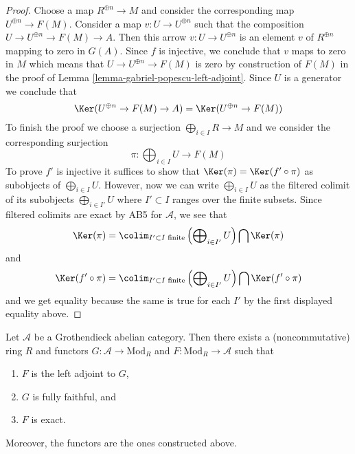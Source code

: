 \begin{proof}
Choose a map $R^{\oplus n} \to M$ and consider the corresponding map
$U^{\oplus n} \to F(M)$. Consider a map $v : U \to U^{\oplus n}$
such that the composition $U \to U^{\oplus n} \to F(M) \to A$.
Then this arrow $v : U \to U^{\oplus n}$ is an element
$v$ of $R^{\oplus n}$ mapping to zero in $G(A)$. Since $f$ is injective,
we conclude that $v$ maps to zero in $M$ which means that
$U \to U^{\oplus n} \to F(M)$ is zero by construction of $F(M)$
in the proof of Lemma \ref{lemma-gabriel-popescu-left-adjoint}.
Since $U$ is a generator we conclude that
$$
\Ker(U^{\oplus n} \to F(M) \to A) = \Ker(U^{\oplus n} \to F(M))
$$
To finish the proof we choose a surjection $\bigoplus_{i \in I} R \to M$
and we consider the corresponding surjection
$$
\pi : \bigoplus\nolimits_{i \in I} U \longrightarrow F(M)
$$
To prove $f'$ is injective it suffices to show that
$\Ker(\pi) = \Ker(f' \circ \pi)$ as subobjects of $\bigoplus_{i \in I} U$.
However, now we can write $\bigoplus_{i \in I} U$ as the filtered colimit
of its subobjects $\bigoplus_{i \in I'} U$ where $I' \subset I$
ranges over the finite subsets. Since filtered colimits are
exact by AB5 for $\mathcal{A}$, we see that
$$
\Ker(\pi) =
\colim_{I' \subset I\text{ finite}}
\left(\bigoplus\nolimits_{i \in I'} U\right)
\bigcap \Ker(\pi)
$$
and
$$
\Ker(f' \circ \pi) =
\colim_{I' \subset I\text{ finite}}
\left(\bigoplus\nolimits_{i \in I'} U\right)
\bigcap \Ker(f' \circ \pi)
$$
and we get equality because the same is true for each $I'$ by
the first displayed equality above.
\end{proof}

\begin{theorem}
\label{theorem-gabriel-popescu}
Let $\mathcal{A}$ be a Grothendieck abelian category. Then there exists
a (noncommutative) ring $R$ and functors $G : \mathcal{A} \to \text{Mod}_R$
and $F : \text{Mod}_R \to \mathcal{A}$ such that
\begin{enumerate}
\item $F$ is the left adjoint to $G$,
\item $G$ is fully faithful, and
\item $F$ is exact.
\end{enumerate}
Moreover, the functors are the ones constructed above.
\end{theorem}

